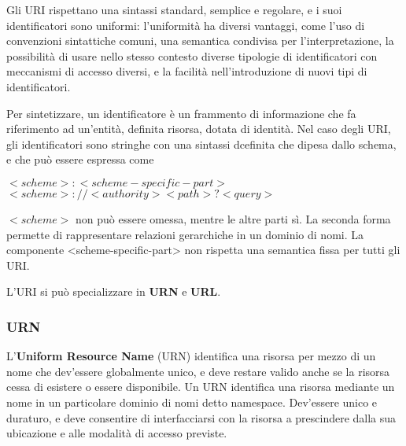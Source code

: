            \vspace{3mm}
            
            Gli URI rispettano una sintassi standard, semplice e regolare, e i suoi identificatori sono uniformi: l'uniformità ha diversi vantaggi, come l'uso di convenzioni sintattiche comuni, una semantica condivisa per l'interpretazione, la possibilità di usare nello stesso contesto diverse tipologie di identificatori con meccanismi di accesso diversi, e la facilità nell'introduzione di nuovi tipi di identificatori.
            
            \vspace{3mm}
            
            Per sintetizzare, un identificatore è un frammento di informazione che fa riferimento ad un'entità, definita risorsa, dotata di identità. Nel caso degli URI, gli identificatori sono stringhe con una sintassi dcefinita che dipesa dallo schema, e che può essere espressa come
            
            \begin{center}
            \(<scheme>:<scheme-specific-part>\)
            \(<scheme>://<authority><path>?<query>\)
            \end{center}
            
            \(<scheme>\) non può essere omessa, mentre le altre parti sì. La seconda forma permette di rappresentare relazioni gerarchiche in un dominio di nomi. La componente <scheme-specific-part> non rispetta una semantica fissa per tutti gli URI.
            
            \vspace{3mm}
            
            L'URI si può specializzare in \textbf{URN} e \textbf{URL}.
        
        \subsubsection{URN}
        
            L'\textbf{Uniform Resource Name} (URN) identifica una risorsa per mezzo di un nome che dev'essere globalmente unico, e deve restare valido anche se la risorsa cessa di esistere o essere disponibile. 
            Un URN identifica una risorsa mediante un nome in un particolare dominio di nomi detto namespace. Dev'essere unico e duraturo, e deve consentire di interfacciarsi con la risorsa a prescindere dalla sua ubicazione e alle modalità di accesso previste. 
            
